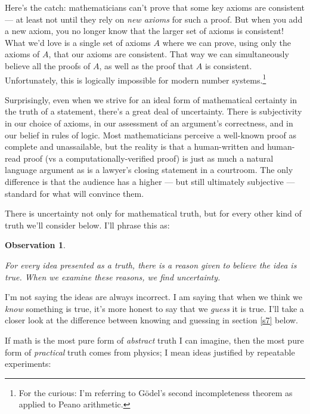 \documentclass[11pt, oneside]{article}   	%
\newtheorem{obs}{Observation}
\begin{document}
\begin{itemize}
        Here's the catch: mathematicians can't prove that some key axioms are
        consistent --- at least not until they rely on {\em new axioms} for such
        a proof. But when you add a new axiom, you no longer know that the
        larger set of axioms is consistent! What we'd love is a single set of
        axioms $A$ where we can prove, using only the axioms of $A$, that our
        axioms are consistent. That way we can simultaneously believe all the
        proofs of $A$, as
        well as the proof that $A$ is consistent. Unfortunately, this is
        logically impossible for modern number
        systems.\footnote{For
        the curious: I'm referring to G\"odel's second
        incompleteness theorem as applied to Peano arithmetic.}
\end{itemize}

Surprisingly,
even when we strive for an ideal form of
mathematical certainty in the truth of a statement, there's a great deal of
uncertainty.
There is subjectivity in our choice of axioms,
in our assessment of an argument's correctness,
and
in our belief in rules of logic.
Most mathematicians perceive a well-known proof as complete and unassailable,
but the reality is that a human-written and human-read proof (vs
a computationally-verified proof) is just as much a natural language argument as
is a lawyer's closing statement in a courtroom.
The only difference is that the audience has a higher --- but still ultimately
subjective --- standard for what will convince them.

There is uncertainty not only for mathematical truth, but for
every other kind of truth we'll consider below.
I'll phrase this as:

\newcommand{\obsone}{
    For every idea presented as a truth, there is a reason
    given to believe the idea is true.
    When we examine these reasons, we find uncertainty.
}
\begin{obs}\label{o1}
    \obsone
\end{obs}

I'm not saying the ideas are always incorrect. I am saying that when we think we
{\em know} something is true, it's more honest to say that we {\em guess} it is
true. I'll take a closer look at
the difference between knowing and guessing in section \ref{s7} below.

If math is the most pure form of {\em abstract} truth I can imagine, then the
most pure form of {\em practical} truth comes from physics; I mean ideas
justified by repeatable experiments:
\end{document}
